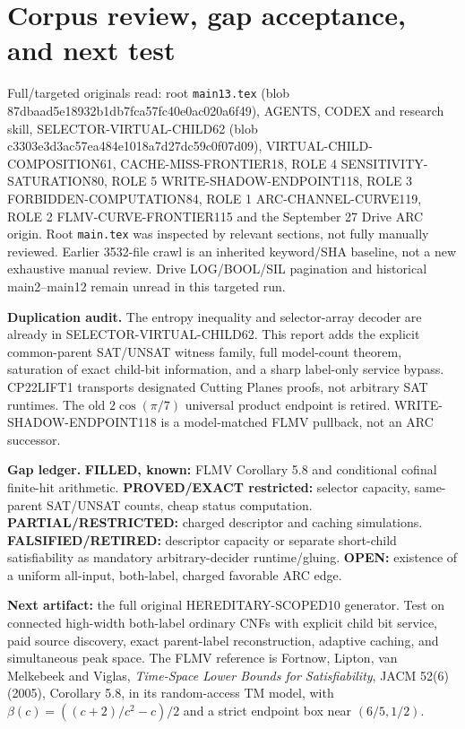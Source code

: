 \documentclass[11pt]{article}
\begin{document}
\section{Corpus review, gap acceptance, and next test}
Full/targeted originals read: root \texttt{main13.tex} (blob 87dbaad5e18932b1db7fca57fc40e0ac020a6f49), AGENTS, CODEX and research skill, SELECTOR-VIRTUAL-CHILD62 (blob c3303e3d3ac57ea484e1018a7d27dc59c0f07d09), VIRTUAL-CHILD-COMPOSITION61, CACHE-MISS-FRONTIER18, ROLE 4 SENSITIVITY-SATURATION80, ROLE 5 WRITE-SHADOW-ENDPOINT118, ROLE 3 FORBIDDEN-COMPUTATION84, ROLE 1 ARC-CHANNEL-CURVE119, ROLE 2 FLMV-CURVE-FRONTIER115 and the September 27 Drive ARC origin. Root \texttt{main.tex} was inspected by relevant sections, not fully manually reviewed. Earlier 3532-file crawl is an inherited keyword/SHA baseline, not a new exhaustive manual review. Drive LOG/BOOL/SIL pagination and historical main2--main12 remain unread in this targeted run.
\par\noindent\textbf{Duplication audit.} The entropy inequality and selector-array decoder are already in SELECTOR-VIRTUAL-CHILD62. This report adds the explicit common-parent SAT/UNSAT witness family, full model-count theorem, saturation of exact child-bit information, and a sharp label-only service bypass. CP22LIFT1 transports designated Cutting Planes proofs, not arbitrary SAT runtimes. The old $2\cos(\pi/7)$ universal product endpoint is retired. WRITE-SHADOW-ENDPOINT118 is a model-matched FLMV pullback, not an ARC successor.
\par\noindent\textbf{Gap ledger.} \textbf{FILLED, known:} FLMV Corollary 5.8 and conditional cofinal finite-hit arithmetic. \textbf{PROVED/EXACT restricted:} selector capacity, same-parent SAT/UNSAT counts, cheap status computation. \textbf{PARTIAL/RESTRICTED:} charged descriptor and caching simulations. \textbf{FALSIFIED/RETIRED:} descriptor capacity or separate short-child satisfiability as mandatory arbitrary-decider runtime/gluing. \textbf{OPEN:} existence of a uniform all-input, both-label, charged favorable ARC edge.
\par\noindent\textbf{Next artifact:} the full original HEREDITARY-SCOPED10 generator. Test on connected high-width both-label ordinary CNFs with explicit child bit service, paid source discovery, exact parent-label reconstruction, adaptive caching, and simultaneous peak space. The FLMV reference is Fortnow, Lipton, van Melkebeek and Viglas, \emph{Time-Space Lower Bounds for Satisfiability}, JACM 52(6) (2005), Corollary 5.8, in its random-access TM model, with $\beta(c)=((c+2)/c^2-c)/2$ and a strict endpoint box near $(6/5,1/2)$.
\end{document}
